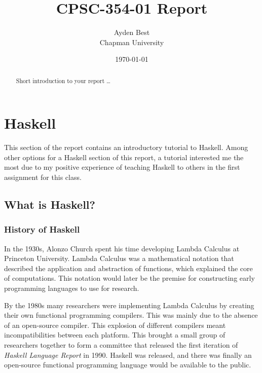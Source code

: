 \documentclass{article}
\title{CPSC-354-01 Report}
\author{Ayden Best  \\ Chapman University}
\date{\today}
\begin{document}
\maketitle

\begin{abstract}
Short introduction to your report \ldots 
\end{abstract}

\tableofcontents

\clearpage
\section{Haskell}\label{haskell}

This section of the report contains an introductory tutorial to Haskell. Among other options for a Haskell section of this report, a tutorial interested me the most due to my positive experience of teaching Haskell to others in the first assignment for this class.

    \subsection{What is Haskell?}
    
        \subsubsection{History of Haskell}
        In the 1930s, Alonzo Church spent his time developing Lambda Calculus at Princeton University. Lambda Calculus was a mathematical notation that described the application and abstraction of functions, which explained the core of computations. This notation would later be the premise for constructing early programming languages to use for research.
        
        \medskip
        By the 1980s many researchers were implementing Lambda Calculus by creating their own functional programming compilers. This was mainly due to the absence of an open-source compiler. This explosion of different compilers meant incompatibilities between each platform. This brought a small group of researchers together to form a committee that released the first iteration of \textit{Haskell Language Report} in 1990. Haskell was released, and there was finally an open-source functional programming language would be available to the public.
        
\end{document}
